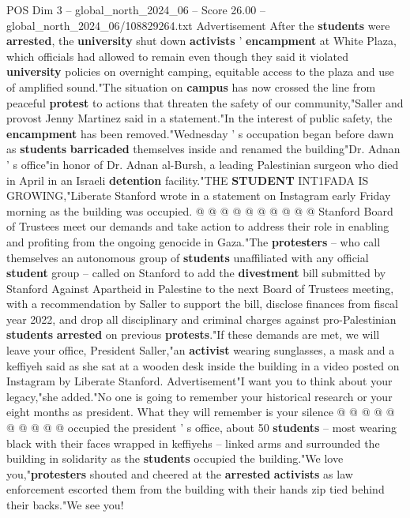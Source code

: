 \begin{textsample}{POS Dim 3 – global\_north\_2024\_06 – Score 26.00 – global\_north\_2024\_06/108829264.txt}
Advertisement After the \textbf{students} were \textbf{arrested}, the \textbf{university} shut down \textbf{activists} ' \textbf{encampment} at White Plaza, which officials had allowed to remain even though they said it violated \textbf{university} policies on overnight camping, equitable access to the plaza and use of amplified sound."The situation on \textbf{campus} has now crossed the line from peaceful \textbf{protest} to actions that threaten the safety of our community,"Saller and provost Jenny Martinez said in a statement."In the interest of public safety, the \textbf{encampment} has been removed."Wednesday ' s occupation began before dawn as \textbf{students} \textbf{barricaded} themselves inside and renamed the building"Dr.
Adnan ' s office"in honor of Dr.
Adnan al-Bursh, a leading Palestinian surgeon who died in April in an Israeli \textbf{detention} facility."THE \textbf{STUDENT} INT1FADA IS GROWING,"Liberate Stanford wrote in a statement on Instagram early Friday morning as the building was occupied. @ @ @ @ @ @ @ @ @ @ Stanford Board of Trustees meet our demands and take action to address their role in enabling and profiting from the ongoing genocide in Gaza."The \textbf{protesters} -- who call themselves an autonomous group of \textbf{students} unaffiliated with any official \textbf{student} group -- called on Stanford to add the \textbf{divestment} bill submitted by Stanford Against Apartheid in Palestine to the next Board of Trustees meeting, with a recommendation by Saller to support the bill, disclose finances from fiscal year 2022, and drop all disciplinary and criminal charges against pro-Palestinian \textbf{students} \textbf{arrested} on previous \textbf{protests}."If these demands are met, we will leave your office, President Saller,"an \textbf{activist} wearing sunglasses, a mask and a keffiyeh said as she sat at a wooden desk inside the building in a video posted on Instagram by Liberate Stanford.
Advertisement"I want you to think about your legacy,"she added."No one is going to remember your historical research or your eight months as president.
What they will remember is your silence @ @ @ @ @ @ @ @ @ @ occupied the president ' s office, about 50 \textbf{students} -- most wearing black with their faces wrapped in keffiyehs -- linked arms and surrounded the building in solidarity as the \textbf{students} occupied the building."We love you,"\textbf{protesters} shouted and cheered at the \textbf{arrested} \textbf{activists} as law enforcement escorted them from the building with their hands zip tied behind their backs."We see you!

\end{textsample}
